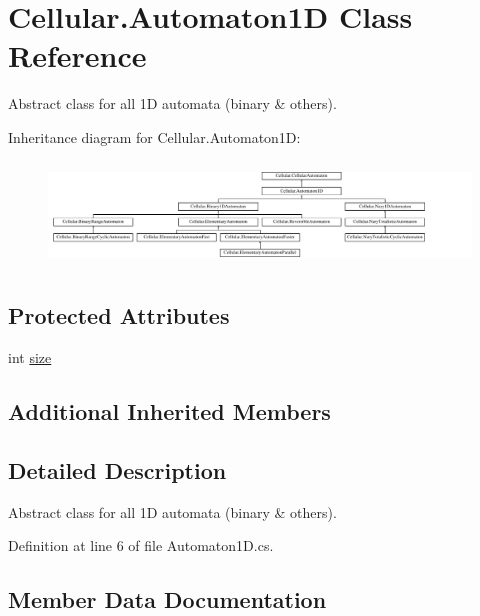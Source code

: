 \hypertarget{class_cellular_1_1_automaton1_d}{}\section{Cellular.\+Automaton1\+D Class Reference}
\label{class_cellular_1_1_automaton1_d}


Abstract class for all 1\+D automata (binary \& others).  


Inheritance diagram for Cellular.\+Automaton1\+D\+:\begin{figure}[H]
\begin{center}
\leavevmode
\includegraphics[height=2.800000cm]{class_cellular_1_1_automaton1_d}
\end{center}
\end{figure}
\subsection*{Protected Attributes}
\begin{DoxyCompactItemize}
\item 
int \hyperlink{class_cellular_1_1_automaton1_d_a915129ccf0f1e7092844c99ce6a28e5b}{size}
\end{DoxyCompactItemize}
\subsection*{Additional Inherited Members}


\subsection{Detailed Description}
Abstract class for all 1\+D automata (binary \& others). 



Definition at line 6 of file Automaton1\+D.\+cs.



\subsection{Member Data Documentation}
\hypertarget{class_cellular_1_1_automaton1_d_a915129ccf0f1e7092844c99ce6a28e5b}{}
